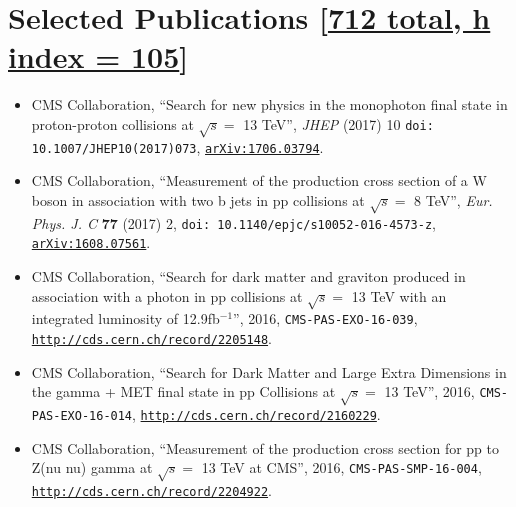 \documentclass[10pt]{article} %
\begin{document}

\section{Selected Publications [\href{https://inspirehep.net/author/profile/T.Perry.1}{712 total, h index = 105}]}

\begin{itemize}

\item CMS Collaboration, 
  ``Search for new physics in the monophoton final state in proton-proton collisions at $\sqrt{s}=$ 13 TeV'',
  \emph{JHEP} (2017) 10
  \texttt{doi: 10.1007/JHEP10(2017)073},
  \texttt{\href{http://arxiv.org/abs/1706.03794}{arXiv:1706.03794}}.

\item CMS Collaboration, 
  ``Measurement of the production cross section of a W boson
  in association with two b jets in pp collisions at $\sqrt{s}=$ 8 TeV'',
  \emph{Eur. Phys. J. C} {\bf 77} (2017) 2, 
  \texttt{doi: 10.1140/epjc/s10052-016-4573-z},
  \texttt{\href{http://arxiv.org/abs/1608.07561}{arXiv:1608.07561}}.

\item CMS Collaboration, 
  ``Search for dark matter and graviton produced in
  association with a photon in pp collisions at $\sqrt{s}=$ 13 TeV
  with an integrated luminosity of 12.9fb$^{-1}$'',
  2016,
  \texttt{CMS-PAS-EXO-16-039},
  \texttt{\href{http://cds.cern.ch/record/2205148}{http://cds.cern.ch/record/2205148}}.

\item CMS Collaboration, 
  ``Search for Dark Matter and Large Extra Dimensions in the
  gamma + MET final state in pp Collisions at $\sqrt{s}=$ 13 TeV'',
  2016,
  \texttt{CMS-PAS-EXO-16-014},
  \texttt{\href{http://cds.cern.ch/record/2160229}{http://cds.cern.ch/record/2160229}}.

\item CMS Collaboration, 
  ``Measurement of the production cross section for pp to 
  Z(nu nu) gamma at $\sqrt{s}=$ 13 TeV at CMS'', 2016,
  \texttt{CMS-PAS-SMP-16-004},
  \texttt{\href{http://cds.cern.ch/record/2204922}{http://cds.cern.ch/record/2204922}}.


\end{itemize}
\end{document}
